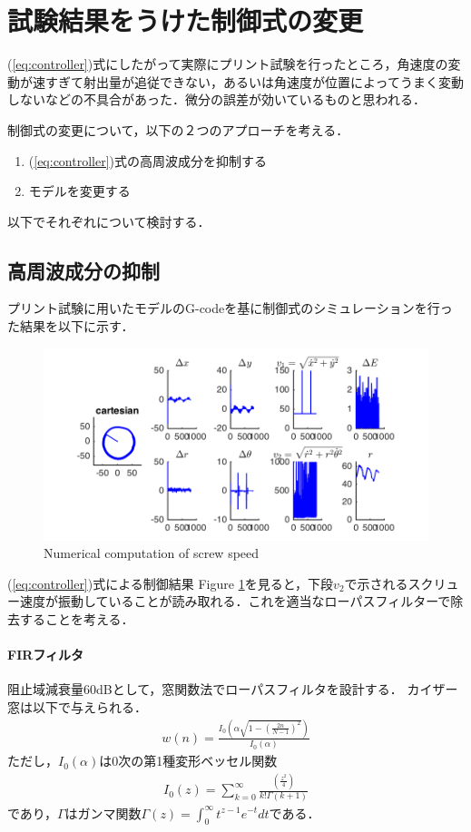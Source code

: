 \documentclass[twocolumn,oneside,a4paper]{article}
\begin{document}
\section{試験結果をうけた制御式の変更}
(\ref{eq:controller})式にしたがって実際にプリント試験を行ったところ，角速度の変動が速すぎて射出量が追従できない，あるいは角速度が位置によってうまく変動しないなどの不具合があった．微分の誤差が効いているものと思われる．

制御式の変更について，以下の２つのアプローチを考える．

\begin{enumerate}
     \item (\ref{eq:controller})式の高周波成分を抑制する
     \item モデルを変更する
\end{enumerate}

以下でそれぞれについて検討する．
\subsection{高周波成分の抑制}
プリント試験に用いたモデルのG-codeを基に制御式のシミュレーションを行った結果を以下に示す．

\begin{figure}[htbp]
    \includegraphics[bb=0 0 432 216,width=1\columnwidth]{gcodesim.png}
    \caption{Numerical computation of screw speed}
    \label{fig:noise}
\end{figure}

(\ref{eq:controller})式による制御結果
Figure \ref{fig:noise}を見ると，下段$v_2$で示されるスクリュー速度が振動していることが読み取れる．これを適当なローパスフィルターで除去することを考える．

\paragraph{FIRフィルタ}
阻止域減衰量60dBとして，窓関数法でローパスフィルタを設計する．
カイザー窓は以下で与えられる．
\begin{eqnarray*}
	w(n) = \frac{I_0 \left( \alpha \sqrt{1-\left(\frac{2n}{N-1}\right)^2} \right) }{I_0(\alpha)}	
\end{eqnarray*}
ただし，$I_0({\alpha})$は0次の第1種変形ベッセル関数
\begin{eqnarray*}
 I_0(z)	= \sum_{k=0}^{\infty}\frac{\left(\frac{z^2}{4}\right)}{k!\Gamma (k+1)}
\end{eqnarray*}
であり，$\Gamma$はガンマ関数$\Gamma(z) = \int_0^{\infty} t^{z-1}e^{-t} dt$である．
\end{document}
